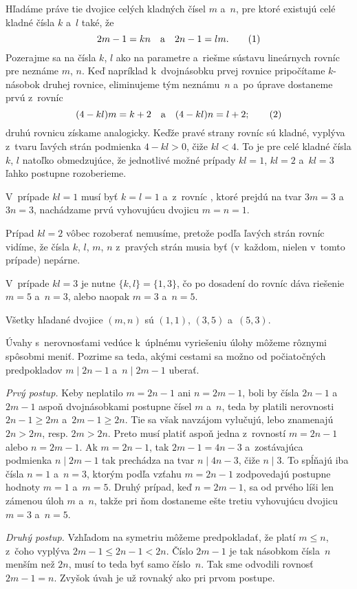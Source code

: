 {%
Hľadáme práve tie dvojice celých kladných čísel $m$ a~$n$, pre ktoré
existujú celé kladné čísla $k$ a~$l$ také, že
$$
2m-1=kn\quad\text{a}\quad 2n-1=lm.
\tag1
$$
Pozerajme sa na čísla $k$, $l$ ako na parametre a~riešme sústavu
lineárnych rovníc  pre neznáme $m$, $n$.
Keď napríklad k~dvojnásobku prvej rovnice pripočítame
$k$-násobok druhej rovnice, eliminujeme tým neznámu~$n$ a~po úprave
dostaneme prvú z~rovníc
$$
(4-kl)m=k+2\quad\text{a}\quad (4-kl)n=l+2;
\tag2
$$
druhú rovnicu získame analogicky. Keďže pravé strany rovníc 
sú kladné, vyplýva z~tvaru ľavých strán
podmienka $4-kl>0$, čiže $kl<4$.
To je pre celé kladné čísla $k$, $l$
natoľko obmedzujúce, že jednotlivé možné prípady $kl=1$,
$kl=2$ a~$kl=3$ ľahko postupne rozoberieme.

V~prípade $kl=1$ musí byť $k=l=1$ a~z~rovníc , ktoré prejdú na
tvar $3m=3$ a~$3n=3$, nachádzame prvú vyhovujúcu dvojicu
$m=n=1$.

Prípad $kl=2$ vôbec rozoberať nemusíme, pretože podľa ľavých
strán rovníc  vidíme, že čísla $k$, $l$, $m$, $n$ z~pravých strán musia byť
(v~každom, nielen v~tomto prípade) nepárne.

V~prípade $kl=3$ je nutne $\{k,l\}=\{1,3\}$, čo po dosadení do
rovníc  dáva riešenie $m=5$ a~$n=3$, alebo naopak $m=3$ a~$n=5$.

\zaver
Všetky hľadané dvojice $(m,n)$ sú $(1,1)$, $(3,5)$ a~$(5,3)$.

\ineriesenie
Úvahy s~nerovnosťami vedúce k~úplnému
vyriešeniu úlohy môžeme rôznymi spôsobmi meniť.
Pozrime sa teda, akými cestami sa možno od
počiatočných predpokladov $m\mid 2n-1$ a~$n\mid 2m-1$ uberať.

\smallskip
{\it Prvý postup.}
Keby neplatilo $m=2n-1$ ani $n=2m-1$, boli by čísla $2n-1$
a~$2m-1$ aspoň dvojnásobkami postupne čísel $m$ a~$n$, teda by
platili nerovnosti $2n-1\ge2m$ a~$2m-1\ge2n$. Tie sa však
navzájom vylučujú, lebo znamenajú $2n>2m$, resp. $2m>2n$.
Preto musí platiť aspoň jedna z~rovností $m=2n-1$ alebo $n=2m-1$.
Ak $m=2n-1$, tak $2m-1=4n-3$ a~zostávajúca podmienka $n\mid 2m-1$ tak
prechádza na tvar $n\mid 4n-3$, čiže $n\mid 3$. To spĺňajú iba
čísla $n=1$ a~$n=3$, ktorým podľa vzťahu $m=2n-1$ zodpovedajú postupne
hodnoty $m=1$ a~$m=5$. Druhý prípad, keď $n=2m-1$, sa od prvého
líši len zámenou úloh $m$ a~$n$, takže pri ňom dostaneme ešte tretiu
vyhovujúcu dvojicu $m=3$  a~$n=5$.

\smallskip
{\it Druhý postup.}
Vzhľadom na symetriu môžeme predpokladať,
že platí $m\le n$, z~čoho vyplýva $2m-1\le 2n-1<2n$.
Číslo $2m-1$ je tak násobkom čísla~$n$ menším než $2n$,
musí to teda byť samo číslo~$n$. Tak sme odvodili rovnosť
$2m-1=n$. Zvyšok úvah je už rovnaký ako pri prvom
postupe.

}
